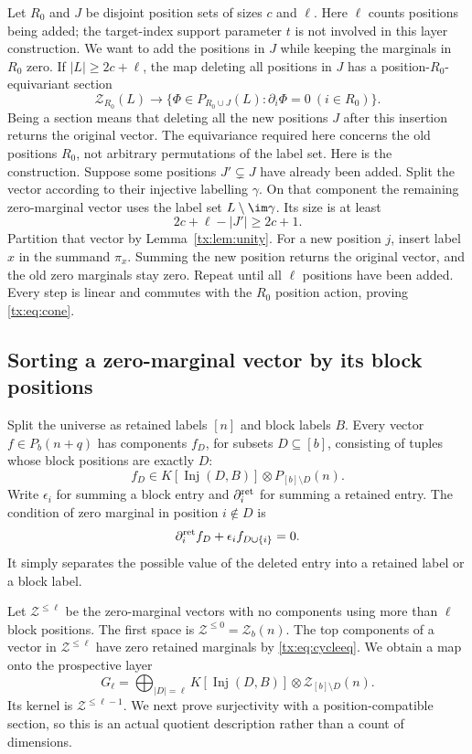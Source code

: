 \documentclass[11pt,a4paper,oneside,openany]{book}
\theoremstyle{definition}\newtheorem{definition}[theorem]{Definition}
\theoremstyle{remark}\newtheorem{remark}[theorem]{Remark}
\DeclareMathOperator{\Inj}{Inj}
\numberwithin{equation}{chapter}
\begin{document}
Let $R_0$ and $J$ be disjoint position sets of sizes $c$ and $\ell$. Here $\ell$ counts positions being added; the target-index support parameter $t$ is not involved in this layer construction. We want to add the positions in $J$ while keeping the marginals in $R_0$ zero. If $|L|\ge2c+\ell$, the map deleting all positions in $J$ has a position-$R_0$-equivariant section
\begin{equation}\label{tx:eq:cone}
\mathcal Z_{R_0}(L)\longrightarrow
\{\Phi\in P_{R_0\cup J}(L):\partial_i\Phi=0\ (i\in R_0)\}.
\end{equation}
Being a section means that deleting all the new positions $J$
after this insertion returns the original vector. The equivariance
required here concerns the old positions $R_0$, not arbitrary
permutations of the label set.
Here is the construction. Suppose some positions $J'\subsetneq J$ have already been added. Split the vector according to their injective labelling $\gamma$. On that component the remaining zero-marginal vector uses the label set $L\setminus\im\gamma$. Its size is at least
\[2c+\ell-|J'|\ge2c+1.
\]
Partition that vector by Lemma~\ref{tx:lem:unity}. For a new position $j$, insert label $x$ in the summand $\pi_x$. Summing the new position returns the original vector, and the old zero marginals stay zero. Repeat until all $\ell$ positions have been added. Every step is linear and commutes with the $R_0$ position action, proving \eqref{tx:eq:cone}.

\subsection{Sorting a zero-marginal vector by its block positions}
Split the universe as retained labels $[n]$ and block labels $B$. Every vector $f\in P_b(n+q)$ has components $f_D$, for subsets $D\subseteq[b]$, consisting of tuples whose block positions are exactly $D$:
\[f_D\in K[\Inj(D,B)]\otimes P_{[b]\setminus D}(n).
\]
Write $\epsilon_i$ for summing a block entry and $\partial_i^{\rm ret}$ for summing a retained entry. The condition of zero marginal in position $i\notin D$ is
\begin{equation}\label{tx:eq:cycleeq}
\partial_i^{\rm ret}f_D+\epsilon_i f_{D\cup\{i\}}=0.
\end{equation}
It simply separates the possible value of the deleted entry into a retained label or a block label.

Let $\mathcal Z^{\le \ell}$ be the zero-marginal vectors with no components using more than $\ell$ block positions. The first space is $\mathcal Z^{\le0}=\mathcal Z_b(n)$. The top components of a vector in $\mathcal Z^{\le \ell}$ have zero retained marginals by \eqref{tx:eq:cycleeq}. We obtain a map onto the prospective layer
\[G_\ell=\bigoplus_{|D|=\ell}K[\Inj(D,B)]\otimes \mathcal Z_{[b]\setminus D}(n).
\]
Its kernel is $\mathcal Z^{\le \ell-1}$. We next prove surjectivity with a position-compatible section, so this is an actual quotient description rather than a count of dimensions.
\end{document}
